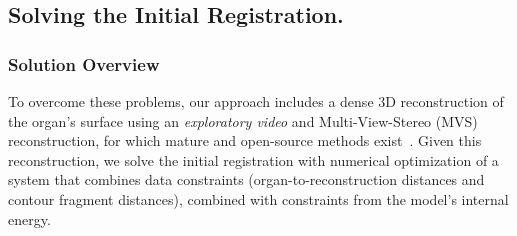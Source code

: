 
\subsection{Solving the Initial Registration.}
\label{sec:registrationOverview}

\subsubsection{Solution Overview}
To overcome these problems, our approach includes a dense 3D reconstruction of the organ's surface using an \emph{exploratory video} and Multi-View-Stereo (MVS) reconstruction, for which mature and open-source methods exist~\cite{Meshroom}. Given this reconstruction, we solve the initial registration with numerical optimization of a system that combines data constraints (organ-to-reconstruction distances and contour fragment distances), combined with constraints from the model's internal energy.


